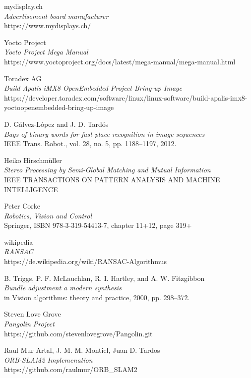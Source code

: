 \documentclass[11pt,a4paper,titlepage,oneside]{report}
\begin{document}
\begin{thebibliography}{1}
	mydisplay.ch\\
	\textit{Advertisement board manufacturer}\\
	https://www.mydisplays.ch/

	Yocto Project\\
	\textit{Yocto Project Mega Manual}\\
	https://www.yoctoproject.org/docs/latest/mega-manual/mega-manual.html

	Toradex AG\\
	\textit{Build Apalis iMX8 OpenEmbedded Project Bring-up Image}\\
	https://developer.toradex.com/software/linux/linux-software/build-apalis-imx8-yoctoopenembedded-bring-up-image

	D. Gálvez-López and J. D. Tardós\\
	\textit{Bags of binary words for fast place recognition in image sequences}\\
	IEEE Trans. Robot., vol. 28, no. 5, pp. 1188–1197, 2012.

	Heiko Hirschmüller\\
	\textit{ Stereo Processing by Semi-Global Matching and Mutual Information}\\
	IEEE TRANSACTIONS ON PATTERN ANALYSIS AND MACHINE INTELLIGENCE
	 
	Peter Corke\\
	\textit{Robotics, Vision and Control}\\
	Springer, ISBN 978-3-319-54413-7, chapter 11+12, page 319+

	wikipedia\\
	\textit{RANSAC}\\
	https://de.wikipedia.org/wiki/RANSAC-Algorithmus

	B. Triggs, P. F. McLauchlan, R. I. Hartley, and A. W. Fitzgibbon\\
	\textit{Bundle adjustment a modern synthesis}\\
 	in Vision algorithms: theory and practice, 2000, pp. 298–372. 

	Steven Love Grove\\
	\textit{Pangolin Project}\\
	https://github.com/stevenlovegrove/Pangolin.git

  Raul Mur-Artal, J. M. M. Montiel, Juan D. Tardos\\
  \textit{ORB-SLAM2 Implemenation}\\
	https://github.com/raulmur/ORB\_SLAM2


\end{thebibliography}
\end{document}
